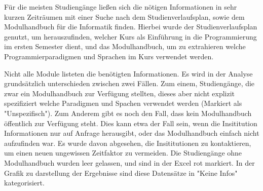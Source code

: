 Für die meisten Studiengänge ließen sich die nötigen Informationen in sehr kurzen Zeiträumen mit einer Suche nach dem Studienverlaufsplan, sowie dem Modulhandbuch für die Informatik finden.
Hierbei wurde der Studienverlaufsplan genutzt, um herauszufinden, welcher Kurs als Einführung in die Programmierung im ersten Semester dient, und das Modulhandbuch, um zu extrahieren welche Programmierparadigmen und Sprachen im Kurs verwendet werden.

Nicht alle Module listeten die benötigten Informationen. Es wird in der Analyse grundsätzlich unterschieden zwischen zwei Fällen. Zum einem, Studiengänge, die zwar ein Modulhandbuch zur Verfügung stellten, dieses aber nicht explizit spezifiziert welche Paradigmen und Spachen verwendet werden (Markiert als "Unspezifisch"). Zum Anderem gibt es noch den Fall, dass kein Modulhandbuch öffentlich zur Verfügung steht. Dies kann etwa der Fall sein, wenn die Insititution Informationen nur auf Anfrage herausgibt, oder das Modulhandbuch einfach nicht aufzufinden war. Es wurde davon abgesehen, die Insititutionen zu kontaktieren, um einen neuen ungewissen Zeitfaktor zu vermeiden. Die Studiengänge ohne Modulhandbuch wurden leer gelassen, und sind in der Excel rot markiert. In der Grafik zu darstellung der Ergebnisse sind diese Datensätze in "Keine Infos" kategorisiert.

